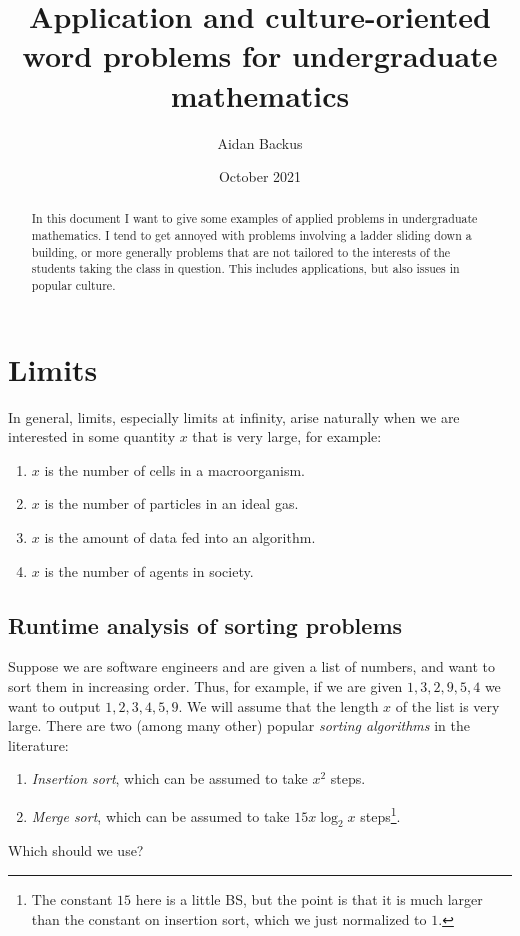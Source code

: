 \documentclass[reqno,12pt,letterpaper]{amsart}
\title[Word problems]{Application and culture-oriented word problems for undergraduate mathematics}
\author{Aidan Backus}
\date{October 2021}
\theoremstyle{definition}
\numberwithin{equation}{section}
\begin{document}
\begin{abstract}
In this document I want to give some examples of applied problems in undergraduate mathematics.
I tend to get annoyed with problems involving a ladder sliding down a building, or more generally problems that are not tailored to the interests of the students taking the class in question.
This includes applications, but also issues in popular culture.
\end{abstract}

\maketitle


\tableofcontents

\section{Limits}
In general, limits, especially limits at infinity, arise naturally when we are interested in some quantity $x$ that is very large, for example:
\begin{enumerate}
\item $x$ is the number of cells in a macroorganism.
\item $x$ is the number of particles in an ideal gas.
\item $x$ is the amount of data fed into an algorithm.
\item $x$ is the number of agents in society.
\end{enumerate}

\subsection{Runtime analysis of sorting problems}
Suppose we are software engineers and are given a list of numbers, and want to sort them in increasing order.
Thus, for example, if we are given $1,3,2,9,5,4$ we want to output $1,2,3,4,5,9$.
We will assume that the length $x$ of the list is very large.
There are two (among many other) popular \emph{sorting algorithms} in the literature:
\begin{enumerate}
\item \emph{Insertion sort}, which can be assumed to take $x^2$ steps.
\item \emph{Merge sort}, which can be assumed to take $15x \log_2 x$ steps\footnote{The constant $15$ here is a little BS, but the point is that it is much larger than the constant on insertion sort, which we just normalized to $1$.}.
\end{enumerate}
Which should we use?
\end{document}
